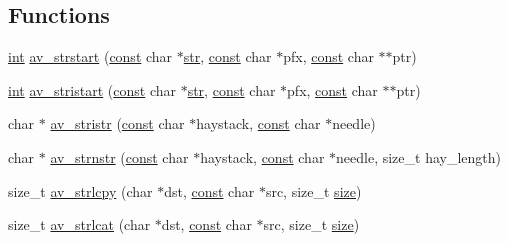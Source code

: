 \subsection*{Functions}
\begin{DoxyCompactItemize}
\item 
\hyperlink{xmltok_8h_a5a0d4a5641ce434f1d23533f2b2e6653}{int} \hyperlink{group__lavu__string_ga6135a12628e2b6a63c8d3d9b3a742b06}{av\+\_\+strstart} (\hyperlink{getopt1_8c_a2c212835823e3c54a8ab6d95c652660e}{const} char $\ast$\hyperlink{sndfile__save_8m_a4b99ff73a8a869319570237b5c57ab03}{str}, \hyperlink{getopt1_8c_a2c212835823e3c54a8ab6d95c652660e}{const} char $\ast$pfx, \hyperlink{getopt1_8c_a2c212835823e3c54a8ab6d95c652660e}{const} char $\ast$$\ast$ptr)
\item 
\hyperlink{xmltok_8h_a5a0d4a5641ce434f1d23533f2b2e6653}{int} \hyperlink{group__lavu__string_gacd29ff1f7e62230a113c88fa10d3f5b9}{av\+\_\+stristart} (\hyperlink{getopt1_8c_a2c212835823e3c54a8ab6d95c652660e}{const} char $\ast$\hyperlink{sndfile__save_8m_a4b99ff73a8a869319570237b5c57ab03}{str}, \hyperlink{getopt1_8c_a2c212835823e3c54a8ab6d95c652660e}{const} char $\ast$pfx, \hyperlink{getopt1_8c_a2c212835823e3c54a8ab6d95c652660e}{const} char $\ast$$\ast$ptr)
\item 
char $\ast$ \hyperlink{group__lavu__string_ga47e14424edfb96d3f6bf0fca96a76fe5}{av\+\_\+stristr} (\hyperlink{getopt1_8c_a2c212835823e3c54a8ab6d95c652660e}{const} char $\ast$haystack, \hyperlink{getopt1_8c_a2c212835823e3c54a8ab6d95c652660e}{const} char $\ast$needle)
\item 
char $\ast$ \hyperlink{group__lavu__string_ga827486f333df7bc9a4e7f9bd212ba472}{av\+\_\+strnstr} (\hyperlink{getopt1_8c_a2c212835823e3c54a8ab6d95c652660e}{const} char $\ast$haystack, \hyperlink{getopt1_8c_a2c212835823e3c54a8ab6d95c652660e}{const} char $\ast$needle, size\+\_\+t hay\+\_\+length)
\item 
size\+\_\+t \hyperlink{group__lavu__string_ga716447ae73b612bcf3a405b9b4608f6c}{av\+\_\+strlcpy} (char $\ast$dst, \hyperlink{getopt1_8c_a2c212835823e3c54a8ab6d95c652660e}{const} char $\ast$src, size\+\_\+t \hyperlink{group__lavu__mem_ga854352f53b148adc24983a58a1866d66}{size})
\item 
size\+\_\+t \hyperlink{group__lavu__string_ga193877ba459faf314c3d285b6082cf73}{av\+\_\+strlcat} (char $\ast$dst, \hyperlink{getopt1_8c_a2c212835823e3c54a8ab6d95c652660e}{const} char $\ast$src, size\+\_\+t \hyperlink{group__lavu__mem_ga854352f53b148adc24983a58a1866d66}{size})
\item 

\end{DoxyCompactItemize}
